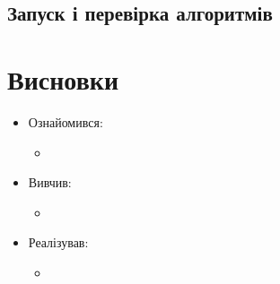\documentclass[../../../../document]{subfiles}
\begin{document}
	\section{Запуск і перевірка алгоритмів}

	\chapter{Висновки}
	\begin{itemize}
		\item Ознайомився:
			\begin{itemize}
				\item
			\end{itemize}
		\item Вивчив:
			\begin{itemize}
				\item
			\end{itemize}
		\item Реалізував:
			\begin{itemize}
				\item
			\end{itemize}
	\end{itemize}
\end{document}
